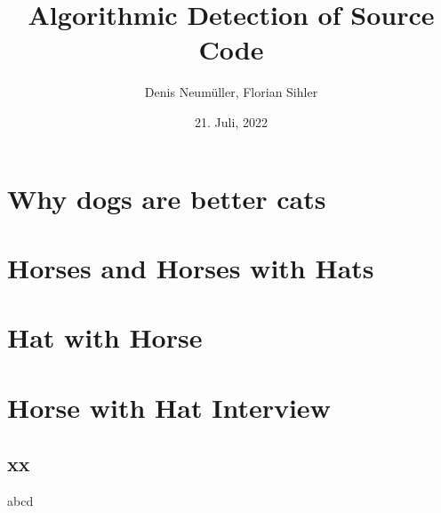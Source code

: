 \documentclass[a3paper, protrait, ngerman]{uulm-cs-poster}
\title{Algorithmic Detection of Source Code}
\author{Denis Neumüller, Florian Sihler}
\date{21. Juli, 2022}
\begin{document}
\maketitle
\section*{Why dogs are better cats}
\lipsum[2]
\begin{multicols}{3}
\section*{Horses and Horses with Hats}
   \lipsum[1-4]
\section*{Hat with Horse}
   \lipsum[4-7]
\end{multicols}
\lipsum[2]
\section*{Horse with Hat Interview}
\begin{multicols}{4}
   \lipsum[2]
   \subsection*{xx}
   abcd
\end{multicols}
\end{document}
